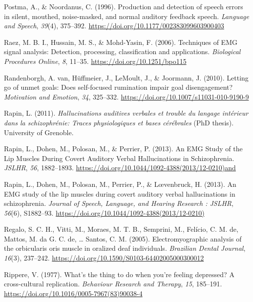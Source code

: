 \documentclass[a4paper,12pt,twoside,openright,oldfontcommands]{memoir}
\begin{document}
\hypertarget{ref-postma_production_1996}{}
Postma, A., \& Noordanus, C. (1996). Production and detection of speech
errors in silent, mouthed, noise-masked, and normal auditory feedback
speech. \emph{Language and Speech}, \emph{39}(4), 375--392.
\url{https://doi.org/10.1177/002383099603900403}

\hypertarget{ref-raez_techniques_2006}{}
Raez, M. B. I., Hussain, M. S., \& Mohd-Yasin, F. (2006). Techniques of
EMG signal analysis: Detection, processing, classification and
applications. \emph{Biological Procedures Online}, \emph{8}, 11--35.
\url{https://doi.org/10.1251/bpo115}

\hypertarget{ref-VanRandenborgh2010}{}
Randenborgh, A. van, Hüffmeier, J., LeMoult, J., \& Joormann, J. (2010).
Letting go of unmet goals: Does self-focused rumination impair goal
disengagement? \emph{Motivation and Emotion}, \emph{34}, 325--332.
\url{https://doi.org/10.1007/s11031-010-9190-9}

\hypertarget{ref-Rapin2011}{}
Rapin, L. (2011). \emph{Hallucinations auditives verbales et trouble du
langage intérieur dans la schizophrénie: Traces physiologiques et bases
cérébrales} (PhD thesis). University of Grenoble.

\hypertarget{ref-rapin_emg_2013}{}
Rapin, L., Dohen, M., Polosan, M., \& Perrier, P. (2013). An EMG Study
of the Lip Muscles During Covert Auditory Verbal Hallucinations in
Schizophrenia. \emph{JSLHR}, \emph{56}, 1882--1893.
\url{https://doi.org/10.1044/1092-4388(2013/12-0210)and}

\hypertarget{ref-Rapin2013}{}
Rapin, L., Dohen, M., Polosan, M., Perrier, P., \& Lœvenbruck, H.
(2013). An EMG study of the lip muscles during covert auditory verbal
hallucinations in schizophrenia. \emph{Journal of Speech, Language, and
Hearing Research : JSLHR}, \emph{56}(6), S1882--93.
\url{https://doi.org/10.1044/1092-4388(2013/12-0210)}

\hypertarget{ref-regalo_electromyographic_2005}{}
Regalo, S. C. H., Vitti, M., Moraes, M. T. B., Semprini, M., Felício, C.
M. de, Mattos, M. da G. C. de, \ldots{} Santos, C. M. (2005).
Electromyographic analysis of the orbicularis oris muscle in oralized
deaf individuals. \emph{Brazilian Dental Journal}, \emph{16}(3),
237--242. \url{https://doi.org/10.1590/S0103-64402005000300012}

\hypertarget{ref-Rippere1977}{}
Rippere, V. (1977). What's the thing to do when you're feeling
depressed? A cross-cultural replication. \emph{Behaviour Research and
Therapy}, \emph{15}, 185--191.
\url{https://doi.org/10.1016/0005-7967(83)90038-4}
\end{document}
